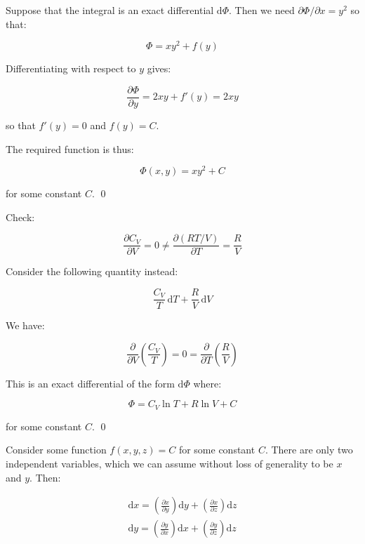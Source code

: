 \documentclass[12pt]{article}
\begin{document}
Suppose that the integral is an exact differential $\mathrm{d}\Phi$. Then we need $\partial \Phi/\partial x = y^{2}$ so that:

\begin{equation}
    \Phi = xy^{2} + f(y)
\end{equation}

Differentiating with respect to $y$ gives:

\begin{equation}
    \frac{\partial \Phi}{\partial y} = 2xy + f'(y) = 2xy
\end{equation}

so that $f'(y) = 0$ and $f(y) = C$.

The required function is thus:

\begin{equation}
    \Phi(x, y) = xy^{2} + C
\end{equation}

for some constant $C$.
\qed


Check:

\begin{equation}
    \frac{\partial C_{V}}{\partial V} = 0 \ne \frac{\partial (RT/V)}{\partial T} = \frac{R}{V}
\end{equation}

Consider the following quantity instead:

\begin{equation}
    \frac{C_{V}}{T} \, \mathrm{d}T + \frac{R}{V} \, \mathrm{d}V
\end{equation}

We have:

\begin{equation}
    \frac{\partial}{\partial V} \left( \frac{C_{V}}{T} \right) = 0 = \frac{\partial}{\partial T} \left( \frac{R}{V} \right)
\end{equation}

This is an exact differential of the form $\mathrm{d}\Phi$ where:

\begin{equation}
    \Phi = C_{V} \ln{T} + R \ln{V} + C
\end{equation}

for some constant $C$.
\qed


Consider some function $f(x, y, z) = C$ for some constant $C$. There are only two independent variables, which we can assume without loss of generality to be $x$ and $y$. Then:

\begin{equation}
    \begin{split}
        \mathrm{d}x = \left( \frac{\partial x}{\partial y} \right) \mathrm{d}y + \left( \frac{\partial x}{\partial z} \right) \mathrm{d}z \\
        \mathrm{d}y = \left( \frac{\partial y}{\partial x} \right) \mathrm{d}x + \left( \frac{\partial y}{\partial z} \right) \mathrm{d}z \\
    \end{split}
\end{equation}
\end{document}
